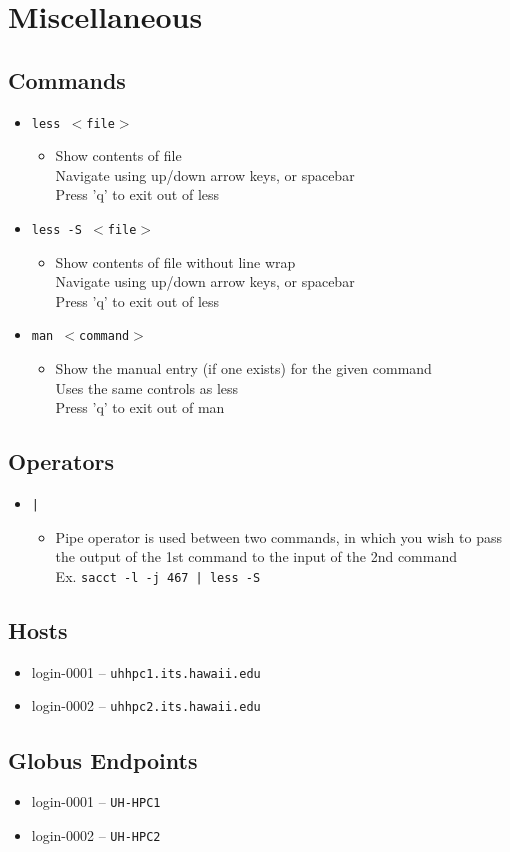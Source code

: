 \documentclass[11pt,twocolumn]{article}
\newcommand{\lft}{$<$}
\newcommand{\rht}{$>$}
\newcommand{\pth}[1]{{\lft}#1{\rht}}
\newcommand{\desc}[1]{\small \begin{itemize}\item[]#1\end{itemize}}
\begin{document}
\section{Miscellaneous}
\subsection{Commands}
\begin{itemize}
\item[] \texttt{less \pth{file}} \desc{Show contents of file\\Navigate using up/down arrow keys, or spacebar\\Press 'q' to exit out of less}
\item[] \texttt{less -S \pth{file}} \desc{Show contents of file without line wrap\\Navigate using up/down arrow keys, or spacebar\\Press 'q' to exit out of less}
\item[] \texttt{man \pth{command}} \desc{Show the manual entry (if one exists) for the given command\\Uses the same controls as less\\Press 'q' to exit out of man}
\end{itemize}

\subsection{Operators}
\begin{itemize}
\item[] \texttt{|} \desc{Pipe operator is used between two commands, in which you wish to pass the output of the 1st command to the input of the 2nd command\\Ex. \texttt{sacct -l -j 467 | less -S }}
\end{itemize}

\subsection{Hosts}
\begin{itemize}
\item[] login-0001 -- \texttt{uhhpc1.its.hawaii.edu}
\item[] login-0002 -- \texttt{uhhpc2.its.hawaii.edu}
\end{itemize}

\subsection{Globus Endpoints}
\begin{itemize}
\item[] login-0001 -- \texttt{UH-HPC1}
\item[] login-0002 -- \texttt{UH-HPC2}
\end{itemize}
\end{document}
